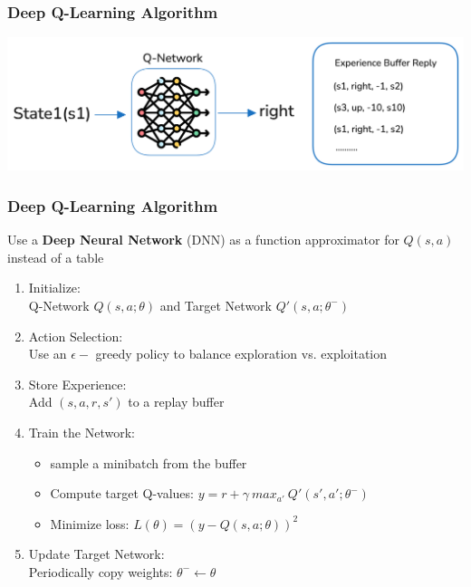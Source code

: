 \begin{frame}
	\frametitle{Deep Q-Learning Algorithm}
	\vspace{1cm}
	\centering
	\includegraphics[scale=0.2]{buffer}
\end{frame}


\begin{frame}
	\frametitle{Deep Q-Learning Algorithm }
	\vspace{0.2cm}
	Use a \textbf{Deep Neural Network} (DNN) as a function approximator for $Q(s,a)$ instead of a table
		\begin{enumerate}		
			\pause
			\item Initialize: \\ Q-Network $Q(s,a;\theta)$ and Target Network $Q'(s,a;\theta^{-})$
			\pause
			\item Action Selection: \\ Use an $\epsilon-$ greedy policy to balance exploration vs. exploitation
			\pause
			\item Store Experience: \\ Add $(s,a,r,s')$ to a replay buffer
			\pause
			\item Train the Network: \\ 
				\begin{itemize} 
					 \item sample a minibatch from the buffer
					 \item Compute target Q-values: $y = r + \gamma \ max_{a'} \ Q'(s',a';\theta^{-})$
					\item Minimize loss: $L(\theta)=(y-Q(s,a;\theta))^2$
				\end{itemize}
			\pause
			\item Update Target Network: \\ Periodically copy weights: $\theta^{-} \leftarrow \theta$

		\end{enumerate}
\end{frame}


